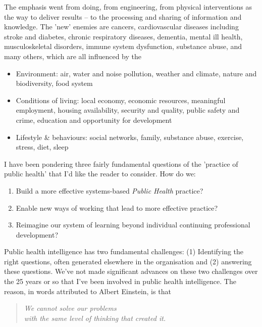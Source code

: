 The emphasis went from doing, from engineering, from physical interventions as the way to deliver results -- to the processing and sharing of information and knowledge. The 'new' enemies are cancers, cardiovascular diseases including stroke and diabetes, chronic respiratory diseases, dementia, mental ill health, musculoskeletal disorders, immune system dysfunction, substance abuse, and many others, which are all influenced by the
\begin{itemize}
	\item Environment: air, water and noise pollution, weather and climate, nature and biodiversity, food system
	\item Conditions of living: local economy, economic resources, meaningful employment, housing availability, security and quality, public safety and crime, education and opportunity for development
	\item Lifestyle \& behaviours: social networks, family, substance abuse, exercise, stress, diet, sleep
\end{itemize}

I have been pondering three fairly fundamental questions of the 'practice of public health' that I'd like the reader to consider. How do we:
\begin{enumerate}
	\item Build a more effective systems-based \emph{Public Health} practice?
	\item Enable new ways of working that lead to more effective practice?
	\item Reimagine our system of learning beyond individual continuing professional development?
\end{enumerate}






Public health intelligence has two fundamental challenges: (1) Identifying the right questions, often generated elsewhere in the organisation and (2) answering these questions. We've not made significant advances on these two challenges over the 25 years or so that I've been involved in public health intelligence. The reason, in words attributed to Albert Einstein, is that

\begin{quote}
	\centering 
	\emph{We cannot solve our problems}\\ 
	\emph{with the same level of thinking that created it.}
\end{quote}

